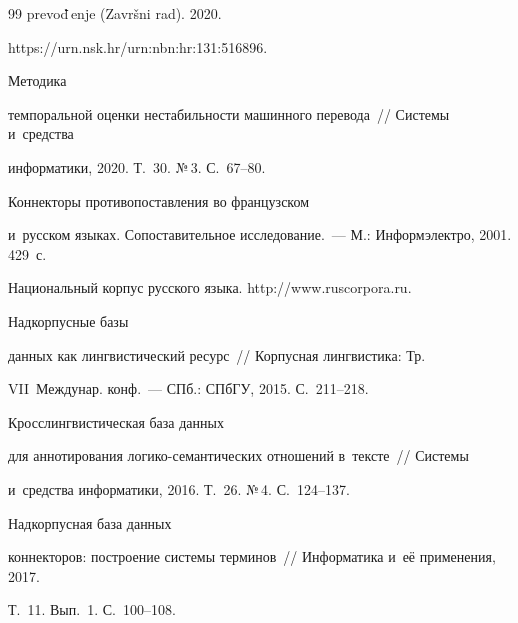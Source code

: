 {{\begin{thebibliography}{99}
prevod$\hspace*{-3pt}^{\mbox{-}}$\!enje (Zavr\v{s}ni rad). 2020. 


{\sf https://urn.nsk.hr/urn:nbn:hr:131:516896}.




 Методика 


темпоральной оценки не\-ста\-биль\-ности машинного перевода~/\!\!/ Сис\-те\-мы и~средства 


информатики, 2020. Т.~30. №\,3. С.~67--80.




 Коннекторы противопоставления во французском 


и~русском языках. Со\-по\-ста\-ви\-тель\-ное исследование.~--- М.: Информэлектро, 2001. 429~с.




Национальный корпус русского языка. {\sf http://www.ruscorpora.ru}.







 Надкорпусные базы 


данных как лингвистический ресурс~/\!\!/ Корпусная лингвистика: Тр. 


VII~Междунар. конф.~--- СПб.: СПбГУ, 2015. С.~211--218.







 Кросслингвистическая база данных 


для аннотирования ло\-ги\-ко-се\-ман\-ти\-че\-ских отношений в~тексте~/\!\!/ Сис\-те\-мы 


и~средства информатики, 2016. Т.~26. №\,4. С.~124--137.







 Надкорпусная база данных 


коннекторов: построение сис\-те\-мы терминов~/\!\!/ Информатика и~её применения, 2017. 


Т.~11. Вып.~1. С.~100--108.





\end{thebibliography}}}
